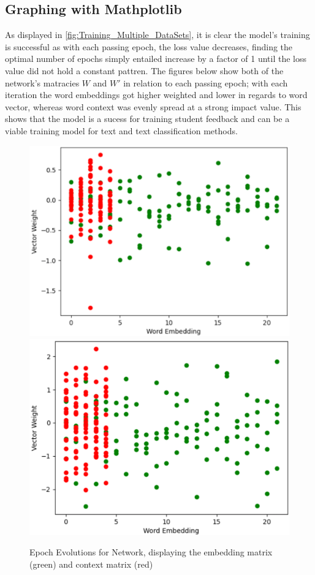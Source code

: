 \subsection{Graphing with Mathplotlib}

As displayed in \autoref{fig:Training_Multiple_DataSets}, it is clear the model's training is successful as with each passing epoch, the loss value decreases, finding the optimal number of epochs simply entailed increase by a factor of 1 until the loss value did not hold a constant pattren. The figures below show both of the network's matracies $W$ and $W'$ in relation to each passing epoch; with each iteration the word embeddings got higher weighted and lower in regards to word vector, whereas word context was evenly spread at a strong impact value. This shows that the model is a sucess for training student feedback and can be a viable training model for text and text classification methods.

\begin{figure}[H]
    \includegraphics[width=0.49\columnwidth]{figures/chapter-6/epoch1.png}
    \includegraphics[width=0.49\columnwidth]{figures/chapter-6/epoch58.png}
    \caption[Epoch Evolutions for Network]{Epoch Evolutions for Network, displaying the embedding matrix (green) and context matrix (red)
    \label{fig:EpochEvolutions}}
\end{figure}

